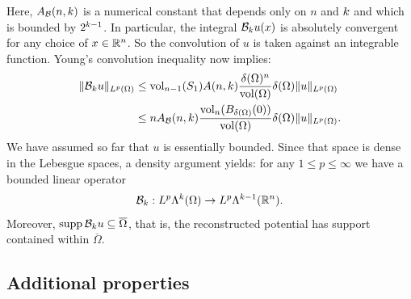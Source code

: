 \documentclass[10pt,a4paper]{article}
\begin{document}
Here, $A_{{\mathcal B}}(n,k)$ is a numerical constant that depends only on $n$ and $k$ 
and which is bounded by $2^{k-1}$. 
In particular, the integral ${\mathcal B}_{k} u(x)$ is absolutely convergent for any choice of $x \in {\mathbb R}^{n}$. 
So the convolution of $u$ is taken against an integrable function. 
Young's convolution inequality now implies: 
\begin{align*}
    \| {\mathcal B}_{k} u \|_{L^{p}(\Omega)}
    &
    \leq 
    \operatorname{vol}_{n-1}(S_1) A(n,k) \frac{ {\delta}(\Omega)^{n} }{\operatorname{vol}(\Omega)} 
    {\delta}(\Omega)
    \| u \|_{L^{p}(\Omega)}
    \\&
    \leq 
    n A_{{\mathcal B}}(n,k) \frac{ \operatorname{vol}_{n}(B_{{\delta}(\Omega)}(0)) }{\operatorname{vol}(\Omega)} 
    {\delta}(\Omega)
    \| u \|_{L^{p}(\Omega)}
    .
\end{align*}
We have assumed so far that $u$ is essentially bounded.
Since that space is dense in the Lebesgue spaces, a density argument yields: 
for any $1 \leq p \leq \infty$ we have a bounded linear operator 
\begin{gather*}
    {\mathcal B}_{k} : L^{p}\Lambda^{k}(\Omega) \rightarrow L^{p}\Lambda^{k-1}({\mathbb R}^n).
\end{gather*}
Moreover, $\operatorname{supp} {\mathcal B}_{k} u \subseteq \overline\Omega$,
that is, the reconstructed potential has support contained within $\overline\Omega$. 
\\





\subsection{Additional properties}
\end{document}
